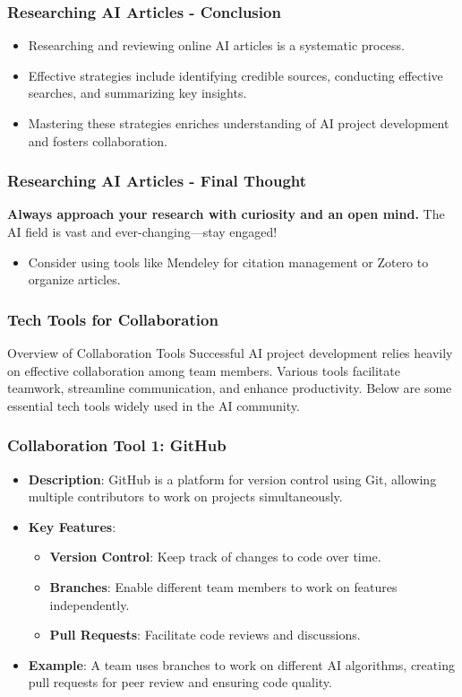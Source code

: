 \documentclass{beamer}
\begin{document}
\begin{frame}[fragile]
    \frametitle{Researching AI Articles - Conclusion}
    \begin{itemize}
        \item Researching and reviewing online AI articles is a systematic process.
        \item Effective strategies include identifying credible sources, conducting effective searches, and summarizing key insights.
        \item Mastering these strategies enriches understanding of AI project development and fosters collaboration.
    \end{itemize}
\end{frame}

\begin{frame}[fragile]
    \frametitle{Researching AI Articles - Final Thought}
    \textbf{Always approach your research with curiosity and an open mind.} 
    The AI field is vast and ever-changing—stay engaged! 
    \begin{itemize}
        \item Consider using tools like Mendeley for citation management or Zotero to organize articles.
    \end{itemize}
\end{frame}

\begin{frame}[fragile]
    \frametitle{Tech Tools for Collaboration}
    \begin{block}{Overview of Collaboration Tools}
        Successful AI project development relies heavily on effective collaboration among team members. Various tools facilitate teamwork, streamline communication, and enhance productivity. Below are some essential tech tools widely used in the AI community.
    \end{block}
\end{frame}

\begin{frame}[fragile]
    \frametitle{Collaboration Tool 1: GitHub}
    \begin{itemize}
        \item \textbf{Description}: GitHub is a platform for version control using Git, allowing multiple contributors to work on projects simultaneously.
        \item \textbf{Key Features}:
            \begin{itemize}
                \item \textbf{Version Control}: Keep track of changes to code over time.
                \item \textbf{Branches}: Enable different team members to work on features independently.
                \item \textbf{Pull Requests}: Facilitate code reviews and discussions.
            \end{itemize}
        \item \textbf{Example}: A team uses branches to work on different AI algorithms, creating pull requests for peer review and ensuring code quality.
    \end{itemize}
\end{frame}
\end{document}
